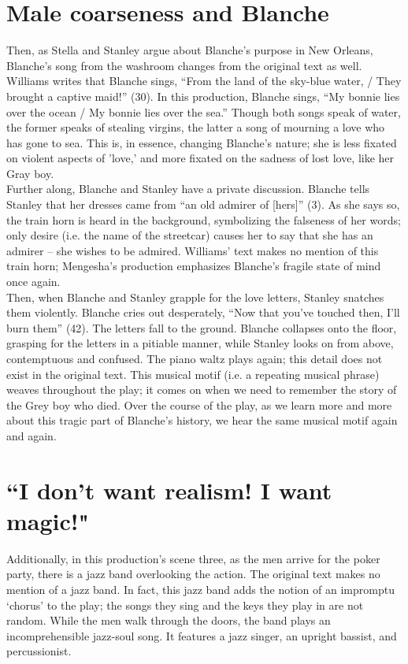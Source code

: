 \documentclass{article}
\begin{document}
\section{Male coarseness and Blanche}

\qquad Then, as Stella and Stanley argue about Blanche’s purpose in New Orleans, Blanche’s song from the washroom changes from the original text as well. Williams writes that Blanche sings, ``From the land of the sky-blue water, / They brought a captive maid!” (30). In this production, Blanche sings, ``My bonnie lies over the ocean / My bonnie lies over the sea.” Though both songs speak of water, the former speaks of stealing virgins, the latter a song of mourning a love who has gone to sea. This is, in essence, changing Blanche's nature; she is less fixated on violent aspects of 'love,' and more fixated on the sadness of lost love, like her Gray boy. \\

Further along, Blanche and Stanley have a private discussion. Blanche tells Stanley that her dresses came from ``an old admirer of [hers]” (3). As she says so, the train horn is heard in the background, symbolizing the falseness of her words; only desire (i.e. the name of the streetcar) causes her to say that she has an admirer – she wishes to be admired. Williams’ text makes no mention of this train horn; Mengesha’s production emphasizes Blanche’s fragile state of mind once again. \\

\qquad Then, when Blanche and Stanley grapple for the love letters, Stanley snatches them violently. Blanche cries out desperately, ``Now that you’ve touched then, I’ll burn them” (42). The letters fall to the ground. Blanche collapses onto the floor, grasping for the letters in a pitiable manner, while Stanley looks on from above, contemptuous and confused. The piano waltz plays again; this detail does not exist in the original text. This musical motif (i.e. a repeating musical phrase) weaves throughout the play; it comes on when we need to remember the story of the Grey boy who died. Over the course of the play, as we learn more and more about this tragic part of Blanche’s history, we hear the same musical motif again and again. 
\\

\section{``I don't want realism! I want magic!"}
\qquad Additionally, in this production’s scene three, as the men arrive for the poker party, there is a jazz band overlooking the action. The original text makes no mention of a jazz band. In fact, this jazz band adds the notion of an impromptu ‘chorus’ to the play; the songs they sing and the keys they play in are not random. While the men walk through the doors, the band plays an incomprehensible jazz-soul song. It features a jazz singer, an upright bassist, and percussionist.  \\
\end{document}
